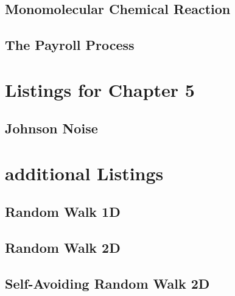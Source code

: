 \subsection{Monomolecular Chemical Reaction}


\subsection{The Payroll Process}


\section{Listings for Chapter 5}

\subsection{Johnson Noise}


\section{additional Listings}



\subsection{Random Walk 1D}


\subsection{Random Walk 2D}


\subsection{Self-Avoiding Random Walk 2D}




%
%


